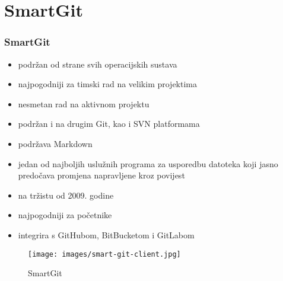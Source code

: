 \section{SmartGit}
\begin{frame}[allowframebreaks]
\frametitle{SmartGit}
 
\begin{itemize}
 \item podržan od strane svih operacijskih sustava
 \item najpogodniji za timski rad na velikim projektima
 \item nesmetan rad na aktivnom projektu
 \item podržan i na drugim Git, kao i SVN platformama
 \item podržava Markdown
 \item jedan od najboljih uslužnih programa za usporedbu datoteka koji jasno predočava promjena napravljene kroz povijest
 \framebreak
 \item na tržistu od 2009. godine
 \item najpogodniji za početnike
 \item integrira s GitHubom, BitBucketom i GitLabom
\end{itemize}


\end{frame}

\begin{figure}[h]
	\centering
	\texttt{[image: images/smart-git-client.jpg]}
	\caption{SmartGit}
\end{figure}
